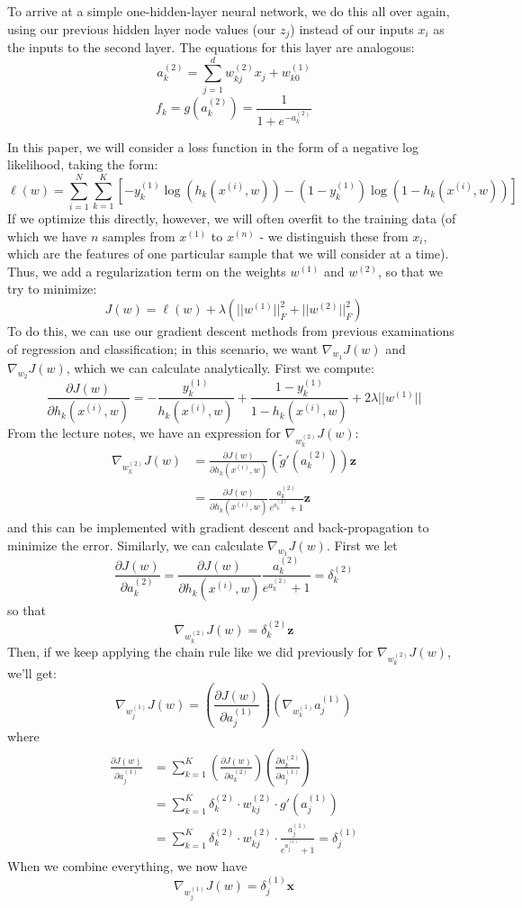 \documentclass[10pt,letterpaper]{article}
\begin{document}
To arrive at a simple one-hidden-layer neural network, we do this all over again, using our previous hidden layer node values (our $z_j$) instead of our inputs $x_i$ as the inputs to the second layer. The equations for this layer are analogous:
$$a_k^{(2)} = \sum_{j=1}^d w_{kj}^{(2)}x_j+w_{k0}^{(1)}$$
$$f_k = g(a_k^{(2)}) = \frac{1}{1 + e^{-a_k^{(2)}}}$$

In this paper, we will consider a loss function in the form of a negative log likelihood, taking the form:
$$\ell(w) = \sum_{i=1}^N\sum_{k=1}^K\left[-y_k^{(1)}\log(h_k(x^{(i)},w))-(1-y_k^{(1)})\log(1-h_k(x^{(i)},w))\right]$$
If we optimize this directly, however, we will often overfit to the training data (of which we have $n$ samples from $x^{(1)}$ to $x^{(n)}$ - we distinguish these from $x_i$, which are the features of one particular sample that we will consider at a time). Thus, we add a regularization term on the weights $w^{(1)}$ and $w^{(2)}$, so that we try to minimize:
$$J(w) = \ell(w)+\lambda(||w^{(1)}||_F^2+||w^{(2)}||_F^2)$$
To do this, we can use our gradient descent methods from previous examinations of regression and classification; in this scenario, we want $\nabla_{w_1}J(w)$ and $\nabla_{w_2}J(w)$, which we can calculate analytically. First we compute:
$$\frac{\partial J(w)}{\partial h_k(x^{(i)},w)}=-\frac{y_k^{(1)}}{h_k(x^{(i)},w)}+\frac{1-y_k^{(1)}}{1-h_k(x^{(i)},w)}+2\lambda||w^{(1)}||$$
From the lecture notes, we have an expression for $\nabla_{w^{(2)}_k}J(w)$:
\begin{align*}
\nabla_{w^{(2)}_k}J(w)&=\frac{\partial J(w)}{\partial h_k(x^{(i)},w)}(\tilde{g}'(a_k^{(2)}))\textbf{z}\\
&=\frac{\partial J(w)}{\partial h_k(x^{(i)},w)}\frac{a_k^{(2)}}{e^{a_k^{(2)}}+1}\textbf{z}
\end{align*}
and this can be implemented with gradient descent and back-propagation to minimize the error. Similarly, we can calculate $\nabla_{w_1}J(w)$. First we let
$$\frac{\partial J(w)}{\partial a_k^{(2)}}=\frac{\partial J(w)}{\partial h_k(x^{(i)},w)}\frac{a_k^{(2)}}{e^{a_k^{(2)}}+1}=\delta_k^{(2)}$$
so that
$$\nabla_{w^{(2)}_k}J(w)=\delta_k^{(2)}\textbf{z}$$
Then, if we keep applying the chain rule like we did previously for $\nabla_{w^{(2)}_k}J(w)$, we'll get:
$$\nabla_{w^{(1)}_j}J(w)=\left(\frac{\partial J(w)}{\partial a_j^{(1)}}\right)\left(\nabla_{w^{(1)}_k}a_j^{(1)}\right)$$
where
\begin{align*}
\frac{\partial J(w)}{\partial a_j^{(1)}}&=\sum_{k=1}^K\left(\frac{\partial J(w)}{\partial a_k^{(2)}}\right)\left(\frac{\partial a_k^{(2)}}{\partial a_j^{(1)}}\right)\\
&=\sum_{k=1}^K\delta_k^{(2)}\cdot w_{kj}^{(2)}\cdot g'(a_j^{(1)})\\
&=\sum_{k=1}^K\delta_k^{(2)}\cdot w_{kj}^{(2)}\cdot \frac{a_j^{(1)}}{e^{a_j^{(1)}}+1} = \delta_j^{(1)}
\end{align*}
When we combine everything, we now have
$$\nabla_{w^{(1)}_j}J(w)=\delta_j^{(1)}\textbf{x}$$
\end{document}
